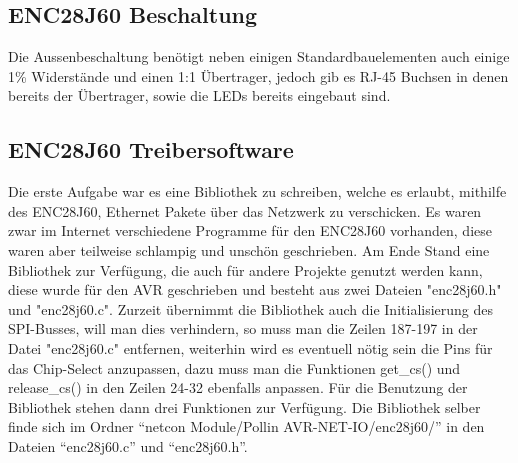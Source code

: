 \documentclass[a4paper,14pt,headsepline]{scrartcl}
\begin{document}
\subsection{ENC28J60 Beschaltung}
Die Aussenbeschaltung benötigt neben einigen Standardbauelementen auch einige 1\% Widerstände und einen 1:1 Übertrager, jedoch gib es RJ-45 Buchsen in denen bereits der Übertrager, sowie die LEDs bereits eingebaut sind.
\begin{figure}[h]
\begin{center}
\end{center}
\end{figure}

\subsection{ENC28J60 Treibersoftware}
Die erste Aufgabe war es eine Bibliothek zu schreiben, welche es erlaubt, mithilfe des ENC28J60, Ethernet Pakete über das Netzwerk zu verschicken. Es waren zwar im Internet verschiedene Programme für den ENC28J60 vorhanden, diese waren aber teilweise schlampig und unschön geschrieben. Am Ende Stand eine Bibliothek zur Verfügung, die auch für andere Projekte genutzt werden kann, diese wurde für den AVR geschrieben und besteht aus zwei Dateien "enc28j60.h" und "enc28j60.c". Zurzeit übernimmt die Bibliothek auch die Initialisierung des SPI-Busses, will man dies verhindern, so muss man die Zeilen 187-197 in der Datei "enc28j60.c" entfernen, weiterhin wird es eventuell nötig sein die  Pins für das Chip-Select anzupassen, dazu muss man die Funktionen get\_cs() und release\_cs() in den Zeilen 24-32 ebenfalls anpassen. Für die Benutzung der Bibliothek stehen dann drei Funktionen zur Verfügung. Die Bibliothek selber finde sich im Ordner "`netcon Module/Pollin AVR-NET-IO/enc28j60/"' in den Dateien "`enc28j60.c"' und "`enc28j60.h"'.
\end{document}

